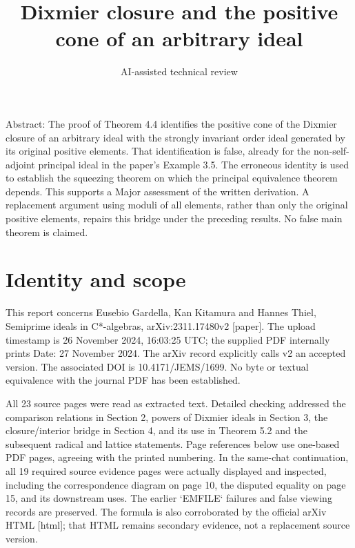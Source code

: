 \documentclass[10pt]{article}
\title{Dixmier closure and the positive cone of an arbitrary ideal}
\author{AI-assisted technical review}
\date{}
\begin{document}
\maketitle
Abstract: The proof of Theorem 4.4 identifies the positive cone of the Dixmier closure of an arbitrary ideal with the strongly invariant order ideal generated by its original positive elements. That identification is false, already for the non-self-adjoint principal ideal in the paper’s Example 3.5. The erroneous identity is used to establish the squeezing theorem on which the principal equivalence theorem depends. This supports a Major assessment of the written derivation. A replacement argument using moduli of all elements, rather than only the original positive elements, repairs this bridge under the preceding results. No false main theorem is claimed.\par
\section*{Identity and scope}
This report concerns Eusebio Gardella, Kan Kitamura and Hannes Thiel, Semiprime ideals in C*-algebras, arXiv:2311.17480v2 [paper]. The upload timestamp is 26 November 2024, 16:03:25 UTC; the supplied PDF internally prints Date: 27 November 2024. The arXiv record explicitly calls v2 an accepted version. The associated DOI is 10.4171/JEMS/1699. No byte or textual equivalence with the journal PDF has been established.\par
All 23 source pages were read as extracted text. Detailed checking addressed the comparison relations in Section 2, powers of Dixmier ideals in Section 3, the closure/interior bridge in Section 4, and its use in Theorem 5.2 and the subsequent radical and lattice statements. Page references below use one-based PDF pages, agreeing with the printed numbering. In the same-chat continuation, all 19 required source evidence pages were actually displayed and inspected, including the correspondence diagram on page 10, the disputed equality on page 15, and its downstream uses. The earlier `EMFILE` failures and false viewing records are preserved. The formula is also corroborated by the official arXiv HTML [html]; that HTML remains secondary evidence, not a replacement source version.\par
\end{document}
